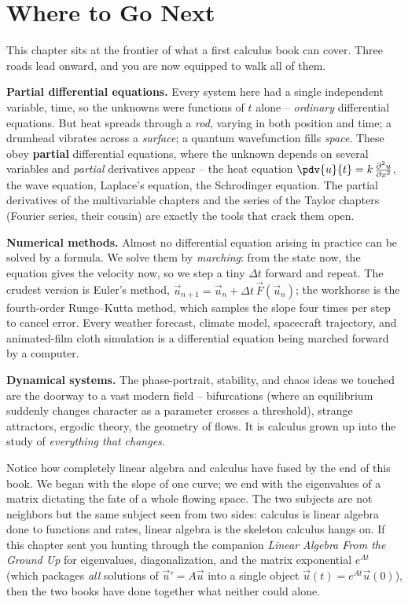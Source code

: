 \section{Where to Go Next}
\label{ch39:next}

This chapter sits at the frontier of what a first calculus book can cover. Three
roads lead onward, and you are now equipped to walk all of them.

\textbf{Partial differential equations.} Every system here had a single
independent variable, time, so the unknowns were functions of $t$ alone --
\emph{ordinary} differential equations. But heat spreads through a \emph{rod},
varying in both position and time; a drumhead vibrates across a \emph{surface};
a quantum wavefunction fills \emph{space}. These obey \textbf{partial}
differential equations, where the unknown depends on several variables and
\emph{partial} derivatives appear -- the heat equation
$\pdv{u}{t} = k\,\frac{\partial^2 u}{\partial x^2}$, the wave equation, Laplace's
equation, the Schrodinger equation. The partial derivatives of the multivariable
chapters and the series of the Taylor chapters (Fourier series, their cousin) are
exactly the tools that crack them open.

\textbf{Numerical methods.} Almost no differential equation arising in practice
can be solved by a formula. We solve them by \emph{marching}: from the state now,
the equation gives the velocity now, so we step a tiny $\Delta t$ forward and
repeat. The crudest version is Euler's method,
$\vec u_{n+1} = \vec u_n + \Delta t\,\vec F(\vec u_n)$; the workhorse is the
fourth-order Runge--Kutta method, which samples the slope four times per step to
cancel error. Every weather forecast, climate model, spacecraft trajectory, and
animated-film cloth simulation is a differential equation being marched forward by
a computer.

\textbf{Dynamical systems.} The phase-portrait, stability, and chaos ideas we
touched are the doorway to a vast modern field -- bifurcations (where an
equilibrium suddenly changes character as a parameter crosses a threshold),
strange attractors, ergodic theory, the geometry of flows. It is calculus grown
up into the study of \emph{everything that changes}.

\begin{connectionbox}
Notice how completely linear algebra and calculus have fused by the end of this
book. We began with the slope of one curve; we end with the eigenvalues of a
matrix dictating the fate of a whole flowing space. The two subjects are not
neighbors but the same subject seen from two sides: calculus is linear algebra
done to functions and rates, linear algebra is the skeleton calculus hangs on.
If this chapter sent you hunting through the companion \emph{Linear Algebra From
the Ground Up} for eigenvalues, diagonalization, and the matrix exponential
$e^{At}$ (which packages \emph{all} solutions of $\vec u'=A\vec u$ into a single
object $\vec u(t) = e^{At}\vec u(0)$), then the two books have done together what
neither could alone.
\end{connectionbox}


